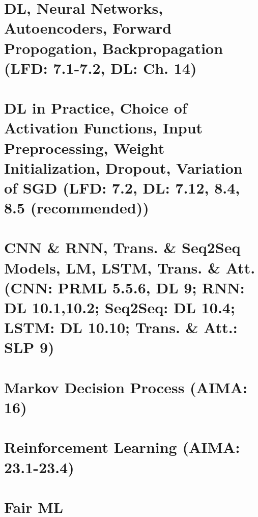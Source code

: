 \documentclass{article}
\begin{document}
\section{DL, Neural Networks, Autoencoders, Forward Propogation, Backpropagation (LFD: 7.1-7.2, DL: Ch. 14)}

\newpage

\section{DL in Practice, Choice of Activation Functions, Input Preprocessing, Weight Initialization, Dropout, Variation of SGD (LFD: 7.2, DL: 7.12, 8.4, 8.5 (recommended))}

\newpage

\section{CNN \& RNN, Trans. \& Seq2Seq Models, LM, LSTM, Trans. \& Att. (CNN: PRML 5.5.6, DL 9; RNN: DL 10.1,10.2; Seq2Seq: DL 10.4; LSTM: DL 10.10; Trans. \& Att.: SLP 9)}

\newpage

\section{Markov Decision Process (AIMA: 16)}

\newpage

\section{Reinforcement Learning (AIMA: 23.1-23.4)}

\newpage

\section{Fair ML}

\end{document}
